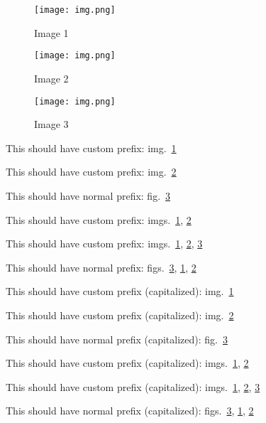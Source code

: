 \begin{figure}
\hypertarget{fig:1}{%
\centering
\texttt{[image: img.png]}
\caption{Image 1}\label{fig:1}
}
\end{figure}

\begin{figure}
\hypertarget{fig:2}{%
\centering
\texttt{[image: img.png]}
\caption{Image 2}\label{fig:2}
}
\end{figure}

\begin{figure}
\hypertarget{fig:3}{%
\centering
\texttt{[image: img.png]}
\caption{Image 3}\label{fig:3}
}
\end{figure}

This should have custom prefix: img.~\ref{fig:1}

This should have custom prefix: img.~\ref{fig:2}

This should have normal prefix: fig.~\ref{fig:3}

This should have custom prefix: imgs.~\ref{fig:1}, \ref{fig:2}

This should have custom prefix:
imgs.~\ref{fig:1}, \ref{fig:2}, \ref{fig:3}

This should have normal prefix:
figs.~\ref{fig:3}, \ref{fig:1}, \ref{fig:2}

This should have custom prefix (capitalized): img.~\ref{fig:1}

This should have custom prefix (capitalized): img.~\ref{fig:2}

This should have normal prefix (capitalized): fig.~\ref{fig:3}

This should have custom prefix (capitalized):
imgs.~\ref{fig:1}, \ref{fig:2}

This should have custom prefix (capitalized):
imgs.~\ref{fig:1}, \ref{fig:2}, \ref{fig:3}

This should have normal prefix (capitalized):
figs.~\ref{fig:3}, \ref{fig:1}, \ref{fig:2}
